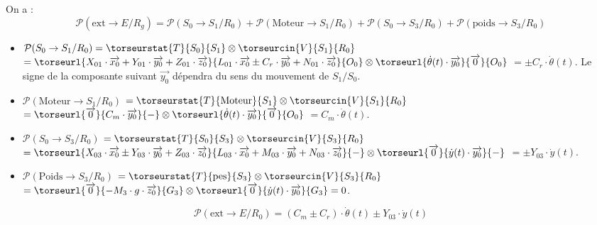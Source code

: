 \ifprof\begin{corrige}
On a : 
$$
\mathcal{P}(\text{ext}\rightarrow E/R_g)=\mathcal{P}(S_0 \rightarrow S_1/R_0)+\mathcal{P}(\text{Moteur}\rightarrow S_1/R_0)
+\mathcal{P}(S_0 \rightarrow S_3/R_0)+\mathcal{P}(\text{poids} \rightarrow S_3/R_0)
$$ 
\begin{itemize}
\item $\mathcal{P}(S_0 \rightarrow S_1/R_0)=\torseurstat{T}{S_0}{S_1}\otimes \torseurcin{V}{S_1}{R_0}$
$=\torseurl{X_{01}\cdot \overrightarrow{x_0}+Y_{01}\cdot \overrightarrow{y_0}+Z_{01}\cdot \overrightarrow{z_0}}{L_{01}\cdot \overrightarrow{x_0} \pm C_r\cdot \overrightarrow{y_0}+N_{01}\cdot \overrightarrow{z_0}}{O_0}
\otimes
\torseurl{\dot{\theta}(t)\cdot \overrightarrow{y_0}}{\overrightarrow{0}}{O_0}$
$=\pm C_r\cdot \dot{\theta}(t)$. 
Le signe de la composante suivant $\overrightarrow{y_0}$ dépendra du sens du mouvement de $S_1/S_0$.
\item $\mathcal{P}(\text{Moteur} \rightarrow S_1/R_0)$ $=\torseurstat{T}{\text{Moteur}}{S_1}\otimes \torseurcin{V}{S_1}{R_0}$
$=\torseurl{\overrightarrow{0}}{C_m\cdot \overrightarrow{y_0}}{-}
\otimes
\torseurl{\dot{\theta}(t)\cdot \overrightarrow{y_0}}{\overrightarrow{0}}{O_0}$
$=C_m\cdot \dot{\theta}(t)$.
\item $
\mathcal{P}(S_0 \rightarrow S_3/R_0)$ $=\torseurstat{T}{S_0}{S_3}\otimes \torseurcin{V}{S_3}{R_0}$
$=\torseurl{X_{03}\cdot \overrightarrow{x_0}\pm Y_{03}\cdot \overrightarrow{y_0}+Z_{03}\cdot \overrightarrow{z_0}}{L_{03}\cdot \overrightarrow{x_0} + M_{03}\cdot \overrightarrow{y_0}+N_{03}\cdot \overrightarrow{z_0}}{-}
\otimes
\torseurl{\overrightarrow{0}}{\dot{y}(t)\cdot \overrightarrow{y_0}}{-}$
$=\pm Y_{03}\cdot \dot{y}(t)$.
\item $\mathcal{P}(\text{Poids} \rightarrow S_3/R_0) $
$=\torseurstat{T}{\text{pes}}{S_3}\otimes \torseurcin{V}{S_3}{R_0}$
 $=\torseurl{\overrightarrow{0}}{-M_3\cdot g\cdot \overrightarrow{z_0}}{G_3}
\otimes
\torseurl{\overrightarrow{0}}{\dot{y}(t)\cdot \overrightarrow{y_0}}{G_3}=0$.
\end{itemize}

$$\mathcal{P}(\text{ext}\rightarrow E/R_0)=\left(C_m\pm C_r\right)\cdot \dot{\theta}(t)\pm Y_{03}\cdot \dot{y}(t)$$
\end{corrige}\else\fi



